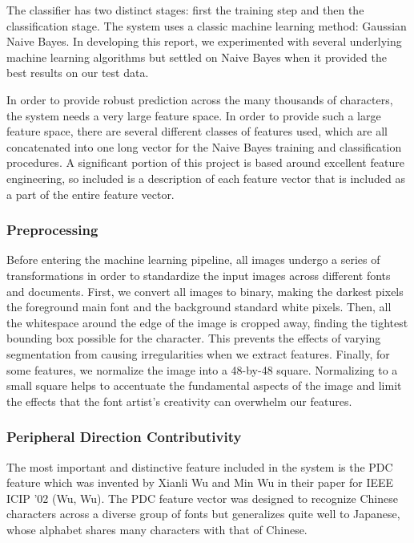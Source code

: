 \documentclass[10pt,twocolumn,letterpaper]{article}
\begin{document}
The classifier has two distinct stages: first the training step and then the classification stage. The system uses a classic machine learning method: Gaussian Naive Bayes. In developing this report, we experimented with several underlying machine learning algorithms but settled on Naive Bayes when it provided the best results on our test data.

In order to provide robust prediction across the many thousands of characters, the system needs a very large feature space. In order to provide such a large feature space, there are several different classes of features used, which are all concatenated into one long vector for the Naive Bayes training and classification procedures. A significant portion of this project is based around excellent feature engineering, so included is a description of each feature vector that is included as a part of the entire feature vector.

\subsubsection{Preprocessing}
Before entering the machine learning pipeline, all images undergo a series of transformations in order to standardize the input images across different fonts and documents. First, we convert all images to binary, making the darkest pixels the foreground main font and the background standard white pixels. Then, all the whitespace around the edge of the image is cropped away, finding the tightest bounding box possible for the character. This prevents the effects of varying segmentation from causing irregularities when we extract features. Finally, for some features, we normalize the image into a 48-by-48 square. Normalizing to a small square helps to accentuate the fundamental aspects of the image and limit the effects that the font artist’s creativity can overwhelm our features.

\subsubsection{Peripheral Direction Contributivity}
\label{section:pdc}
The most important and distinctive feature included in the system is the PDC feature which was invented by Xianli Wu and Min Wu in their paper for IEEE ICIP '02  (Wu, Wu). The PDC feature vector was designed to recognize Chinese characters across a diverse group of fonts but generalizes quite well to Japanese, whose alphabet shares many characters with that of Chinese.
\end{document}
